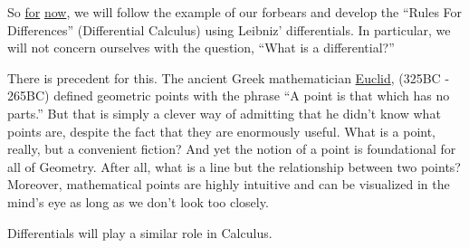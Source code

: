 So \underline{for} \underline{now}, we will follow the example of our
forbears and develop the ``Rules For Differences''
(\alert{Differential Calculus}) using Leibniz' differentials.  In
particular, we will not concern ourselves with the question, ``What is
a differential?''

There is precedent for this. The ancient Greek mathematician
\href{https://mathshistory.st-andrews.ac.uk/Biographies/Euclid/}{Euclid},
(325BC - 265BC)
defined geometric points with the phrase ``A point is that which has
no parts.'' But that is simply a clever way of admitting that he
didn't know what points are, despite the fact that they are enormously
useful.  What is a point, really, but a convenient fiction? And yet
the notion of a point is foundational for all of Geometry. After all,
what is a line but the relationship between two points? Moreover,
mathematical points are highly intuitive and can be visualized in the
mind's eye as long as we don't look too closely.

Differentials will play a similar role in Calculus.


